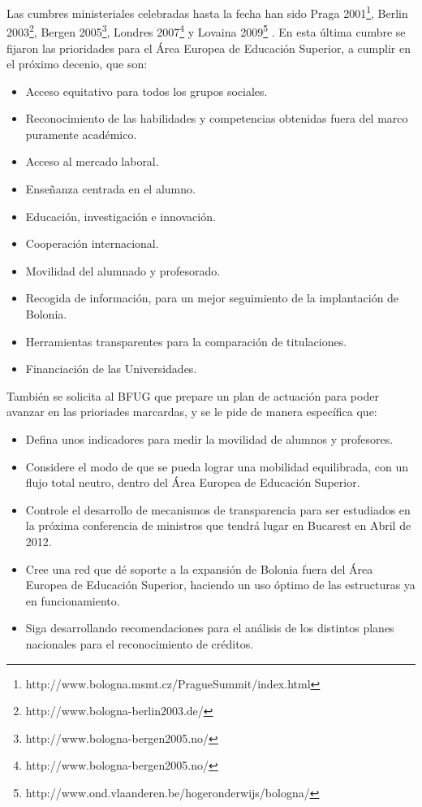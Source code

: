 		Las cumbres ministeriales celebradas hasta la fecha han sido Praga 2001\footnote{http://www.bologna.msmt.cz/PragueSummit/index.html}, Berlin
      2003\footnote{http://www.bologna-berlin2003.de/}, Bergen 2005\footnote{http://www.bologna-bergen2005.no/}, Londres 2007\footnote{http://www.bologna-bergen2005.no/} y Lovaina 2009\footnote{http://www.ond.vlaanderen.be/hogeronderwijs/bologna/} . En esta última cumbre se fijaron las prioridades para el Área Europea de Educación Superior, a cumplir en el próximo decenio, que son:

		\begin{itemize}
			\item Acceso equitativo para todos los grupos sociales.
			\item Reconocimiento de las habilidades y competencias obtenidas fuera del marco puramente académico.
			\item Acceso al mercado laboral.
			\item Enseñanza centrada en el alumno.
			\item Educación, investigación e innovación.
			\item Cooperación internacional.
			\item Movilidad del alumnado y profesorado.
			\item Recogida de información, para un mejor seguimiento de la implantación de Bolonia.
			\item Herramientas transparentes para la comparación de titulaciones.
			\item Financiación de las Universidades.
		\end{itemize}
      
		También se solicita al BFUG que prepare un plan de actuación para poder avanzar en las prioriades marcardas, y se le pide de manera específica que:
		\begin{itemize}
			\item Defina unos indicadores para medir la movilidad de alumnos y profesores.
			\item Considere el modo de que se pueda lograr una mobilidad equilibrada, con un flujo total neutro, dentro del Área Europea de Educación Superior.
			\item Controle el desarrollo de mecanismos de transparencia para ser estudiados en la próxima conferencia de ministros que tendrá lugar en Bucarest en Abril de 2012. 
			\item Cree una red que dé soporte a la expansión de Bolonia fuera del Área Europea de Educación Superior, haciendo un uso óptimo de las estructuras ya en funcionamiento.
			\item Siga desarrollando recomendaciones para el análisis de los distintos planes nacionales para el reconocimiento de créditos.
		\end{itemize}


